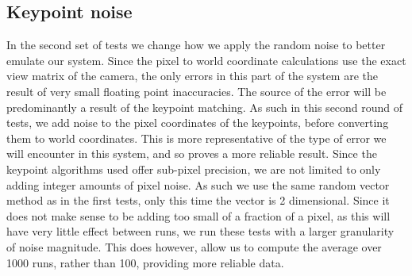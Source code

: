 \subsection{Keypoint noise}
In the second set of tests we change how we apply the random noise to better emulate our system. Since the pixel to world coordinate calculations use the exact view matrix of the camera, the only errors in this part of the system are the result of very small floating point inaccuracies. The source of the error will be predominantly a result of the keypoint matching. As such in this second round of tests, we add noise to the pixel coordinates of the keypoints, before converting them to world coordinates. This is more representative of the type of error we will encounter in this system, and so proves a more reliable result. Since the keypoint algorithms used offer sub-pixel precision, we are not limited to only adding integer amounts of pixel noise. As such we use the same random vector method as in the first tests, only this time the vector is 2 dimensional. Since it does not make sense to be adding too small of a fraction of a pixel, as this will have very little effect between runs, we run these tests with a larger granularity of noise magnitude. This does however, allow us to compute the average over 1000 runs, rather than 100, providing more reliable data.\\

